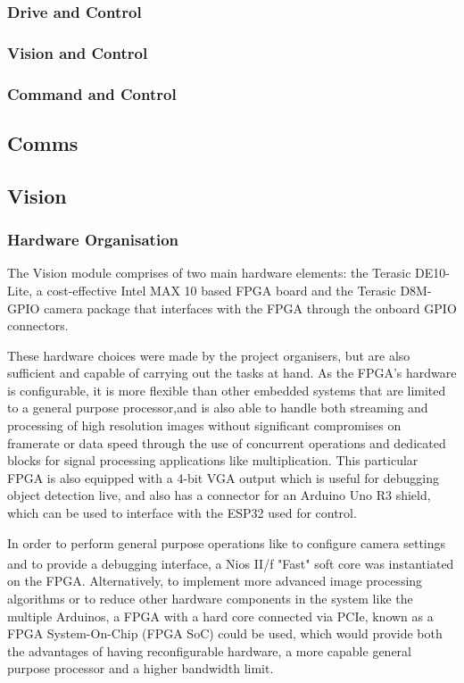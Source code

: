 \documentclass[a4paper]{article}
\begin{document}
\subsubsection{Drive and Control}

\subsubsection{Vision and Control}

\subsubsection{Command and Control}

\subsection{Comms}

\subsection{Vision}


\subsubsection{Hardware Organisation}

The Vision module comprises of two main hardware elements: 
    the Terasic DE10-Lite, a cost-effective Intel MAX 10 based FPGA board 
    \cite{TerasicDE10Web} 
    and the Terasic D8M-GPIO camera package \cite{TerasicD8MWeb}
that interfaces with the FPGA through the onboard GPIO connectors. 

These hardware choices were made by the project organisers, 
but are also sufficient and capable of carrying out the tasks at hand. 
As the FPGA's hardware is configurable, 
it is more flexible than other embedded systems 
that are limited to a general purpose processor,and 
is also able to handle both streaming and processing of high resolution images
without significant compromises on framerate or data speed 
through the use of concurrent operations and dedicated blocks 
for signal processing applications like multiplication.
This particular FPGA is also equipped with a 4-bit VGA output 
which is useful for debugging object detection live, 
and also has a connector for an Arduino Uno R3 shield, \cite{TerasicDE10Web} 
which can be used to interface with the ESP32 used for control.  

In order to perform general purpose operations like
    to configure camera settings
    and to provide a debugging interface,
a Nios\textsuperscript{\textregistered} II/f "Fast" soft core was instantiated on the FPGA. 
Alternatively, to implement more advanced image processing algorithms
or to reduce other hardware components in the system like the multiple Arduinos, 
a FPGA with a hard core connected via PCIe, 
known as a FPGA System-On-Chip (FPGA SoC) \cite{FPGASoC} could be used, 
which would provide both the advantages of having reconfigurable hardware,
a more capable general purpose processor and a higher bandwidth limit. 
\end{document}
